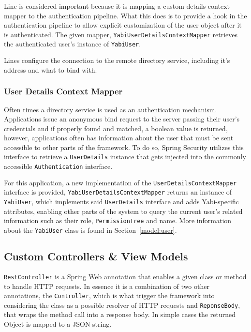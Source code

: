 Line  is considered important because it is mapping a custom details context mapper to the authentication pipeline. What this does is to provide a hook in the authentication pipeline to allow explicit customization of the user object after it is authenticated. The given mapper, \texttt{YabiUserDetailsContextMapper} retrieves the authenticated user's instance of \texttt{YabiUser}.

Lines  configure the connection to the remote directory service, including it's address and what to bind with.

\subsubsection{User Details Context Mapper}\label{impl:detailsmapper}
Often times a directory service is used as an authentication mechanism. Applications issue an anonymous bind request to the server passing their user's credentials and if properly found and matched, a boolean value is returned, however, applications often has information about the user that must be sent accessible to other parts of the framework. To do so, Spring Security utilizes this interface to retrieve a \texttt{UserDetails} instance that gets injected into the commonly accessible \texttt{Authentication} interface.

For this application, a new implementation of the \texttt{UserDetailsContextMapper} interface is provided, \texttt{YabiUserDetailsContextMapper} returns an instance of \texttt{YabiUser}, which implements said \texttt{UserDetails} interface and adds \gls{Yabi}-specific attributes, enabling other parts of the system to query the current user's related information such as their role, \texttt{PermissionTree} and name. More information about the \texttt{YabiUser} class is found in Section~\ref{model:user}.

\subsection{Custom Controllers \& View Models}
\texttt{RestController} is a Spring Web annotation that enables a given class or method to handle \gls{HTTP} requests. In essence it is a combination of two other annotations, the \texttt{Controller}, which is what trigger the framework into considering the class as a possible resolver of  \gls{HTTP} requests and \texttt{ReponseBody}, that wraps the method call into a response body. In simple cases the returned Object is mapped to a \gls{JSON} string.

